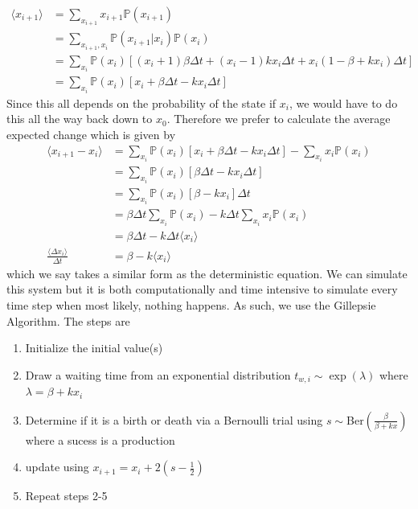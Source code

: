 \documentclass{article}
\newcommand{\p}{\mathbb{P}}
\begin{document}
\begin{equation*}
    \begin{split}
        \langle x_{i+1} \rangle &= \sum_{x_{i+1}} x_{i+1} \p (x_{i+1}) \\
        &= \sum_{x_{i+1},x_i} \p(x_{i+1}|x_i)\p(x_i) \\
        &= \sum_{x_i} \p (x_i) [(x_i+1)\beta \Delta t + (x_i-1)kx_i\Delta t + x_i(1-\beta+kx_i)\Delta t] \\
        &= \sum_{x_i} \p(x_i)[x_i + \beta \Delta t-kx_i \Delta t]
    \end{split}
\end{equation*}
Since this all depends on the probability of the state if $x_i$, we would have to do this all the way back down to $x_0$. Therefore we prefer to calculate the average expected change which is given by 
\begin{equation*}
    \begin{split}
        \langle x_{i+1}-x_i\rangle &= \sum_{x_i} \p(x_i)[x_i+\beta\Delta t-kx_i \Delta t] - \sum_{x_i}x_i\p(x_i) \\ &= \sum_{x_i}\p(x_i) [\beta \Delta t-kx_i\Delta t] \\
        &= \sum_{x_i}\p(x_i)[\beta-kx_i]\Delta t\\
        &= \beta \Delta t\sum_{x_i} \p(x_i) - k\Delta t\sum_{x_i}x_i\p(x_i) \\
        &= \beta \Delta t - k\Delta t \langle x_i \rangle \\
        \frac{\langle \Delta x_i \rangle}{\Delta t}&= \beta - k \langle x_i \rangle
    \end{split}
\end{equation*}
which we say takes a similar form as the deterministic equation. We can simulate this system but it is both computationally and time intensive to simulate every time step when most likely, nothing happens. As such, we use the Gillepsie Algorithm. The steps are 
\begin{enumerate}
    \item Initialize the initial value(s)
    \item Draw a waiting time from an exponential distribution $t_{w,i} \sim \exp(\lambda)$ where $\lambda = \beta+kx_i$ 
    \item Determine if it is a birth or death via a Bernoulli trial using $s \sim $Ber$\left( \frac{\beta}{\beta+kx} \right)$ where a sucess is a production 
    \item update using $x_{i+1} = x_i +2 \left(s-\frac{1}{2}\right)$
    \item Repeat steps 2-5
\end{enumerate}
\end{document}
